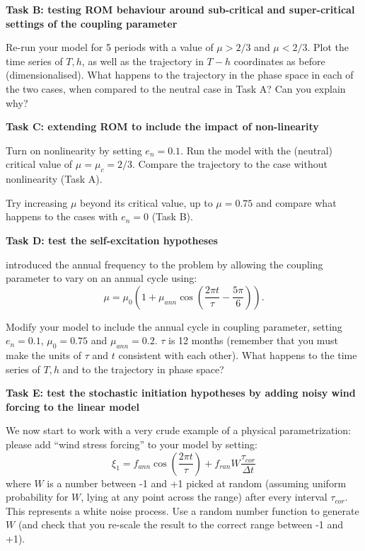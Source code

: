 \documentclass[11pt,a4paper]{article}
\begin{document}
{\large\bf Task B: testing ROM behaviour around sub-critical and super-critical settings of the coupling parameter}

Re-run your model for 5 periods with a value of $\mu > 2/3$ and $\mu <
2/3$. Plot the time series of $T,h$, as well as the trajectory in $T-h$ coordinates as before (dimensionalised). What happens to the trajectory in the phase space in each of the two cases, when compared to the neutral case in Task A? Can
you explain why?

{\large\bf Task C: extending ROM to include the impact of non-linearity}

Turn on nonlinearity by setting $e_n=0.1$. Run the model with the (neutral) critical value of 
$\mu=\mu_c=2/3$. Compare the trajectory to the case without nonlinearity (Task A). 

Try increasing $\mu$ beyond its critical value, up to $\mu = 0.75$ and compare what happens to the cases with $e_n=0$ (Task B). 

{\large\bf Task D: test the self-excitation hypotheses}

\cite{galanti:00} introduced the annual frequency to the problem by
allowing the coupling parameter to vary on an annual cycle using:
\begin{equation}
\mu=\mu_0\left( 1+\mu_{ann}\cos \left( \frac{2\pi t}{\tau} - \frac{5\pi}{6} \right) \right).
\end{equation}

Modify your model to include the annual cycle in coupling parameter,
setting $e_n=0.1$, $\mu_0=0.75$ and $\mu_{ann}=0.2$. $\tau$ is 12
months (remember that you must make the units of $\tau$ and $t$ consistent with each other). What happens to the time series of $T,h$ and to the
trajectory in phase space?


{\large\bf Task E: test the stochastic initiation hypotheses by adding noisy wind forcing to the linear model}

We now start to work with a very crude example of a physical parametrization: please add ``wind stress forcing'' to your model by setting:
\begin{equation}
\xi_1=f_{ann}\cos \left(\frac{2\pi t}{\tau}\right)+f_{ran} W\frac{\tau_{cor}}{\Delta t}
\end{equation}
where $W$ is a number between -1 and +1 picked at random (assuming
uniform probability for $W$, lying at any point across the
range) after every interval $\tau_{cor}$. This represents a white noise
process. Use a random number function to generate $W$
(and check that you re-scale the result to the correct range between
-1 and +1).
\end{document}
